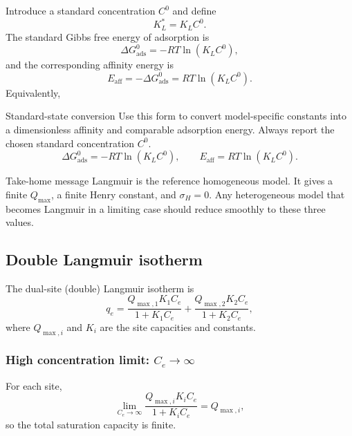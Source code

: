 \documentclass[journal=jacsat,manuscript=article]{achemso}
\begin{document}
Introduce a standard concentration \(C^0\) and define
\begin{equation}
	K_L^{\ast} = K_L C^0.
\end{equation}
The standard Gibbs free energy of adsorption is
\begin{equation}
	\Delta G_{\mathrm{ads}}^{0}
	= - R T \ln\left( K_L C^0 \right),
\end{equation}
and the corresponding affinity energy is
\begin{equation}
	E_{\mathrm{aff}} = - \Delta G_{\mathrm{ads}}^{0}
	= R T \ln\left( K_L C^0 \right).
\end{equation}
Equivalently,
\begin{greenbox}{Standard-state conversion}
	Use this form to convert model-specific constants into a dimensionless affinity and comparable adsorption energy. Always report the chosen standard concentration \(C^0\).
\begin{equation}
	\Delta G_{\mathrm{ads}}^{0}
		= - R T \ln\left( K_L C^0 \right),
		\qquad
		E_{\mathrm{aff}} = R T \ln\left( K_L C^0 \right).
\end{equation}
\end{greenbox}

\begin{greenbox}{Take-home message}
	Langmuir is the reference homogeneous model. It gives a finite
	\(Q_{\max}\), a finite Henry constant, and \(\sigma_H=0\). Any
	heterogeneous model that becomes Langmuir in a limiting case should
	reduce smoothly to these three values.
\end{greenbox}

\subsection{Double Langmuir isotherm}
\label{sec:si_double_langmuir}

The dual-site (double) Langmuir isotherm is
\begin{equation}
	q_e
	= \frac{Q_{\max,1} K_1 C_e}{1 + K_1 C_e}
	+ \frac{Q_{\max,2} K_2 C_e}{1 + K_2 C_e},
	\label{eq:si_double_langmuir}
\end{equation}
where \(Q_{\max,i}\) and \(K_i\) are the site capacities and constants.

\subsubsection{High concentration limit: \(C_e \to \infty\)}

For each site,
\begin{equation}
	\lim_{C_e \to \infty} \frac{Q_{\max,i} K_i C_e}{1 + K_i C_e}
	= Q_{\max,i},
\end{equation}
so the total saturation capacity is finite.
\end{document}
